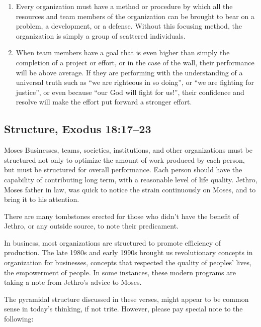 \documentclass[12pt]{memoir}
\begin{document}
\begin{enumerate}
\item Every organization must have a method or procedure by which all the resources and team members of the organization can be brought to bear on a problem, a development, or a defense.
Without this focusing method, the organization is simply a group of scattered individuals. 

\item When team members have a goal that is even higher than simply the
completion of a project or effort, or in the case of the wall, their
performance will be above average. If they are performing with the
understanding of a universal truth such as ``we are righteous in
so doing'', or ``we are fighting for justice'', or even because ``our God will fight for us!'', their confidence and resolve will make the effort put forward a stronger effort.
\end{enumerate}

\subsection[Structure]{Structure, Exodus 18:17--23}

Moses
Businesses, teams, societies, institutions, and other organizations
must be structured not only to optimize the amount of work produced
by each person, but must be structured for overall performance. Each
person should have the capability of contributing long term, with
a reasonable level of life quality. Jethro, Moses father in law, was
quick to notice the strain continuously on Moses, and to bring it
to his attention.

There are many tombstones erected for those who didn't have the benefit
of Jethro, or any outside source, to note their predicament.

In business, most organizations are structured to promote efficiency
of production. The late 1980s and early 1990s brought us revolutionary
concepts in organization for businesses, concepts that respected the quality of peoples' lives, the empowerment of people. In some instances, these modern programs are taking a note from Jethro's advice to Moses.

The pyramidal structure discussed in these verses, might appear to
be common sense in today's thinking, if not trite. However, please
pay special note to the following:
\end{document}
